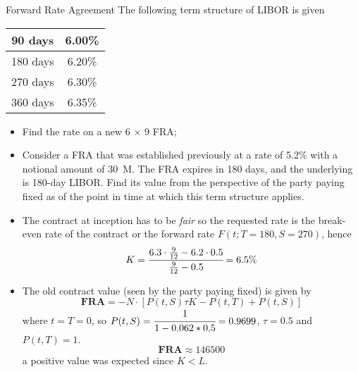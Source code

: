 \documentclass{beamer}
\begin{document}
\begin{frame}{}
\begin{block}{Forward Rate Agreement}
The following term structure of LIBOR is given 
\begin{table}[htbp]
\begin{center}
\begin{tabular}{c|c}
90 days & 6.00\% \\ \hline
180 days & 6.20\% \\ \hline
270 days & 6.30\% \\ \hline
360 days & 6.35\% \\
\end{tabular}
\end{center}
\end{table}
\begin{itemize}
\item Find the rate on a new 6 × 9 FRA;
\item Consider a FRA that was established previously at a rate of 5.2\% with a notional amount of 30~M. The FRA expires in 180 days, and the underlying is 180-day LIBOR. Find its value from the perspective of the party paying fixed as of the point in time at which this term structure applies.
\end{itemize}
\end{block}
\end{frame}

\begin{frame}{}
\begin{itemize}
\item<1-> The contract at inception has to be \emph{fair} so the requested rate is the break-even rate of the contract or the forward rate $F(t; T=180, S=270)$, hence
\begin{equation*}
K = \cfrac{6.3\cdot\frac{9}{12}-6.2\cdot0.5}{\frac{9}{12}-0.5} = 6.5\%
\end{equation*}
\item<2-> The old contract value (seen by the party paying fixed) is given by 
\begin{equation*}
\textbf{FRA} = -N\cdot[P(t,S)\tau K - P(t,T) + P(t, S)]
\end{equation*}
where $t=T=0$, so $P(t,S)=\cfrac{1}{1-0.062*0.5}= 0.9699$, $\tau=0.5$ and $P(t,T)=1$.
\begin{equation*}
\textbf{FRA} \approx 146500
\end{equation*}
a positive value was expected since $K<L$.
\end{itemize}
\end{frame}
\end{document}
